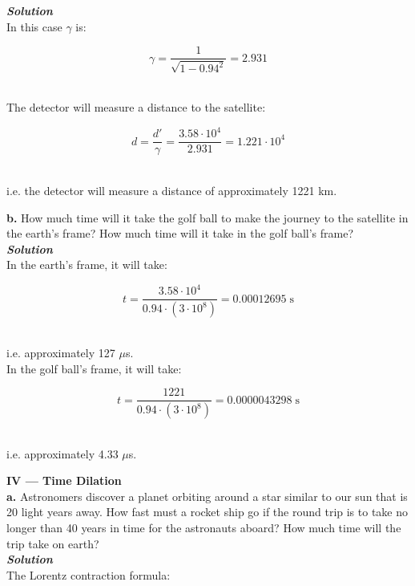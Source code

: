 \documentclass[9pt]{extarticle}
\newcommand{\bfit}[1]{\textbf{\textit{#1}}}
\begin{document}
\begin{multicols*}{2}
{\bfit{Solution}} \\ 

In this case $\gamma$ is:

$$\gamma = \frac{1}{\sqrt{1-0.94^2}}  = 2.931$$ \ 

The detector will measure a distance to the satellite:

$$d = \frac{d'}{\gamma} = \frac{3.58 \cdot 10^4}{2.931} = 1.221 \cdot 10^4$$ \ 

i.e. the detector will measure a distance of approximately 1221 km. \\ 




\dotfill 

\hfill 

{\Large \bf b.} How much time will it take the golf ball to make the journey to the satellite in the earth's frame? How much time will it take in the golf ball's frame? \\ 

{\bfit{Solution}} \\ 

In the earth's frame, it will take:

$$t = \frac{3.58\cdot 10^4}{0.94 \cdot (3 \cdot 10^8)} = 0.00012695 \; \text{s}$$ \ 

i.e. approximately 127 $\mu$s. \\ 

In the golf ball's frame, it will take:

$$t = \frac{1221}{0.94 \cdot (3 \cdot 10^8)} = 0.0000043298 \; \text{s}$$ \

i.e. approximately 4.33 $\mu$s. \\ 






\hrulefill 

\hfill 

{\LARGE \bf IV --- Time Dilation} \\ 

{\Large \bf a.} Astronomers discover a planet orbiting around a star similar to our sun that is 20 light years away. How fast must a rocket ship go if the round trip is to take no longer than 40 years in time for the astronauts aboard? How much time will the trip take on earth? \\ 

{\bfit{Solution}} \\ 

The Lorentz contraction formula:


\end{multicols*}
\end{document}
